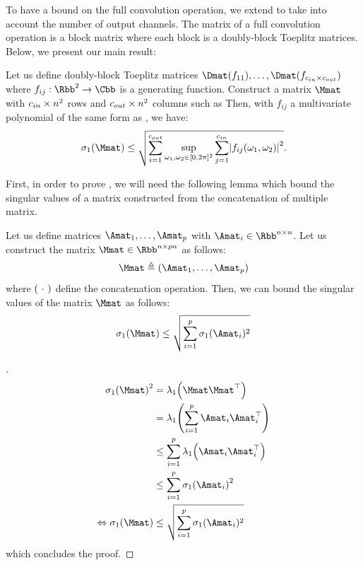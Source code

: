 To have a bound on the full convolution operation, we extend  to take into account the number of output channels.
The matrix of a full convolution operation is a block matrix where each block is a doubly-block Toeplitz matrices. Below, we present our main result:

\begin{maintheorem} \label{theorem:bound_max_sv_convolution} 
Let us define doubly-block Toeplitz matrices $\Dmat(f_{11}), \dots, \Dmat(f_{\cin\times \cout})$ where $f_{ij}: \Rbb^2 \rightarrow \Cbb$ is a generating function. Construct a matrix $\Mmat$ with $c_{in}\times n^2$ rows and $c_{out}\times n^2$ columns such as
Then, with $f_{ij}$ a multivariate polynomial of the same form as , we have:
\begin{equation} \label{equation:lipbound_sv}
 \sigma_1 \left( \Mmat \right) \leq \sqrt{ \sum_{i=1}^{\cout} \sup_{\omega_1, \omega_2 \in [0, 2\pi]^2} \sum_{j = 1}^{\cin} \left|f_{ij}(\omega_1, \omega_2) \right|^2 } .
\end{equation} 
\end{maintheorem}


First, in order to prove , we will need the following lemma which bound the singular values of a matrix constructed from the concatenation of multiple matrix. 

\begin{lemma} \label{theorem:bound_concatenation_matrices}
Let us define matrices $\Amat_1, \dots, \Amat_p$ with $\Amat_i \in \Rbb^{n \times n}$. Let us construct the matrix $\Mmat \in \Rbb^{n \times pn}$ as follows:
\begin{equation}
    \Mmat \triangleq \leftmat \Amat_1, \dots, \Amat_p \rightmat
\end{equation}
where $\leftmat\ \cdot\ \rightmat$ define the concatenation operation. Then, we can bound the singular values of the matrix $\Mmat$ as follows:
\begin{equation}
    \sigma_1(\Mmat) \leq \sqrt{\sum_{i=1}^p \sigma_1(\Amat_i)^2}
\end{equation}
\end{lemma}
\begin{proof}[]
\begin{align}
    \sigma_1\left(\Mmat\right)^2 &= \lambda_1\left(\Mmat \Mmat^\top\right) \\
    &= \lambda_1\left( \sum_{i=1}^p\Amat_i \Amat_i^\top  \right) \\
    &\leq \sum_{i=1}^p \lambda_1\left( \Amat_i \Amat_i^\top  \right) \\
    &\leq \sum_{i=1}^p \sigma_1\left( \Amat_i \right)^2 \\
    \Leftrightarrow \sigma_1\left(\Mmat\right) &\leq \sqrt{\sum_{i=1}^p \sigma_1(\Amat_i)^2}
\end{align}
which concludes the proof.
\end{proof}


